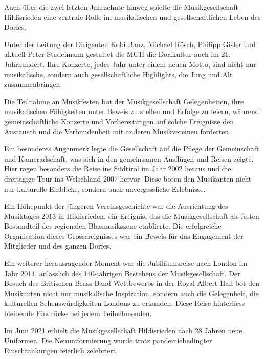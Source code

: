 \begin{history}

    Auch über die zwei letzten Jahrzehnte hinweg spielte die Musikgesellschaft
    Hildisrieden eine zentrale Rolle im musikalischen und gesellschaftlichen
    Leben des Dorfes.

    Unter der Leitung der Dirigenten Kobi Banz, Michael Rösch, Philipp Gisler
    und aktuell Peter Stadelmann gestaltet die MGH die Dorfkultur auch im 21.
    Jahrhundert. Ihre Konzerte, jedes Jahr unter einem neuen Motto, sind nicht
    nur musikalische, sondern auch gesellschaftliche Highlights, die Jung und
    Alt zusammenbringen.

    Die Teilnahme an Musikfesten bot der Musikgesellschaft Gelegenheiten, ihre
    musikalischen Fähigkeiten unter Beweis zu stellen und Erfolge zu feiern,
    während gemeinschaftliche Konzerte und Vorbereitungen auf solche Ereignisse
    den Austausch und die Verbundenheit mit anderen Musikvereinen förderten.

    Ein besonderes Augenmerk legte die Gesellschaft auf die Pflege der
    Gemeinschaft und Kameradschaft, was sich in den gemeinsamen Ausflügen und
    Reisen zeigte. Hier ragen besonders die Reise ins Südtirol im Jahr 2002
    heraus und die dreitägige Tour ins Welschland 2007 hervor. Diese boten den
    Musikanten nicht nur kulturelle Einblicke, sondern auch unvergessliche
    Erlebnisse.

    Ein Höhepunkt der jüngeren Vereinsgeschichte war die Ausrichtung des
    Musiktages 2013 in Hildisrieden, ein Ereignis, das die Musikgesellschaft als
    festen Bestandteil der regionalen Blasmusikszene etablierte. Die
    erfolgreiche Organisation dieses Grossereignisses war ein Beweis für das
    Engagement der Mitglieder und des ganzen Dorfes.

    Ein weiterer herausragender Moment war die Jubiläumsreise nach London im
    Jahr 2014, anlässlich des 140-jährigen Bestehens der Musikgesellschaft. Der
    Besuch des Britischen Brass Band-Wettbewerbs in der Royal Albert Hall bot
    den Musikanten nicht nur musikalische Inspiration, sondern auch die
    Gelegenheit, die kulturellen Sehenswürdigkeiten Londons zu erkunden. Diese
    Reise hinterliess bleibende Eindrücke bei jedem Teilnehmenden.

    Im Juni 2021 erhielt die Musikgesellschaft Hildisrieden nach 28 Jahren neue
    Uniformen. Die Neuuniformierung wurde trotz pandemiebedingter
    Einschränkungen feierlich zelebriert.


\end{history}
